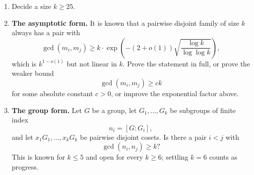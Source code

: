\documentclass[11pt]{article}
\theoremstyle{definition}
\begin{document}
\begin{enumerate}[label=(\alph*), leftmargin=*]
  \item Decide a size $k \geq 25$.
  \item \textbf{The asymptotic form.}
    It is known that a pairwise disjoint family of size $k$ always
    has a pair with
    \[
      \gcd(m_i, m_j)
      \geq
      k \cdot \exp\left( -(2 + o(1)) \sqrt{\frac{\log k}{\log\log k}} \right),
    \]
    which is $k^{1 - o(1)}$ but not linear in $k$. Prove the
    statement in full, or prove the weaker bound
    \[
      \gcd(m_i, m_j) \geq ck
    \]
    for some absolute constant $c > 0$, or improve the exponential
    factor above.
  \item \textbf{The group form.}
    Let $G$ be a group, let $G_1, \ldots, G_k$ be subgroups of finite
    index
    \[
      n_i = [G : G_i],
    \]
    and let $x_1 G_1, \ldots, x_k G_k$ be pairwise disjoint cosets.
    Is there a pair $i < j$ with
    \[
      \gcd(n_i, n_j) \geq k?
    \]
    This is known for $k \leq 5$ and open for every $k \geq 6$;
    settling $k = 6$ counts as progress.
\end{enumerate}
\end{document}
